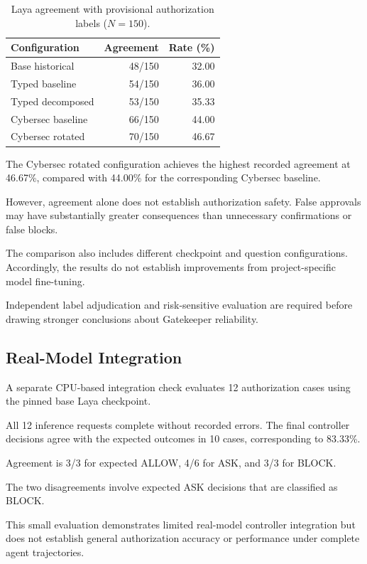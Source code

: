 \documentclass[10pt,conference]{IEEEtran}
\begin{document}
\begin{table}[!t]
\centering
\caption{Laya agreement with provisional
authorization labels ($N=150$).}
\label{tab:laya_results}
\footnotesize
\setlength{\tabcolsep}{4pt}
\begin{tabular}{lrr}
\toprule
Configuration & Agreement & Rate (\%) \\
\midrule
Base historical    & 48/150 & 32.00 \\
Typed baseline     & 54/150 & 36.00 \\
Typed decomposed   & 53/150 & 35.33 \\
Cybersec baseline  & 66/150 & 44.00 \\
Cybersec rotated   & 70/150 & 46.67 \\
\bottomrule
\end{tabular}
\end{table}

The Cybersec rotated configuration achieves
the highest recorded agreement at 46.67\%,
compared with 44.00\% for the corresponding
Cybersec baseline.

However, agreement alone does not establish
authorization safety. False approvals may
have substantially greater consequences
than unnecessary confirmations or false
blocks.

The comparison also includes different
checkpoint and question configurations.
Accordingly, the results do not establish
improvements from project-specific model
fine-tuning.

Independent label adjudication and
risk-sensitive evaluation are required
before drawing stronger conclusions
about Gatekeeper reliability.

\subsection{Real-Model Integration}

A separate CPU-based integration check
evaluates 12 authorization cases using
the pinned base Laya checkpoint.

All 12 inference requests complete without
recorded errors. The final controller
decisions agree with the expected outcomes
in 10 cases, corresponding to 83.33\%.

Agreement is 3/3 for expected ALLOW,
4/6 for ASK, and 3/3 for BLOCK.

The two disagreements involve expected
ASK decisions that are classified as BLOCK.

This small evaluation demonstrates limited
real-model controller integration but does
not establish general authorization accuracy
or performance under complete agent
trajectories.
\end{document}
